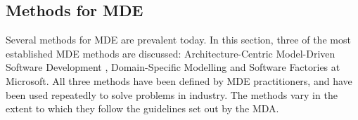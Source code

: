 % 
% 
% 
% 


\subsection{Methods for MDE}
Several methods for MDE are prevalent today. In this section, three of the most established MDE methods are discussed: Architecture-Centric Model-Driven Software Development \cite{stahl06mdsd}, Domain-Specific Modelling \cite{kelly08dsm} and Software Factories \cite{greenfield04software} at Microsoft. All three methods have been defined by MDE practitioners, and have been used repeatedly to solve problems in industry. The methods vary in the extent to which they follow the guidelines set out by the MDA.

